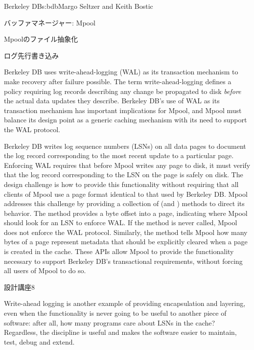 \begin{aosachapter}{Berkeley DB}{s:bdb}{Margo Seltzer and Keith Bostic}
\begin{aosasect1}{バッファマネージャー: Mpool}
\begin{aosasect2}{Mpoolのファイル抽象化}
\end{aosasect2}

\begin{aosasect2}{ログ先行書き込み}

Berkeley DB uses write-ahead-logging (WAL) as its transaction
mechanism to make recovery after failure possible.  The term
write-ahead-logging defines a policy requiring log records describing
any change be propagated to disk \emph{before} the actual data updates
they describe. Berkeley DB's use of WAL as its transaction mechanism
has important implications for Mpool, and Mpool must balance its
design point as a generic caching mechanism with its need to support
the WAL protocol.

Berkeley DB writes log sequence numbers (LSNs) on all data pages to
document the log record corresponding to the most recent update to a
particular page.  Enforcing WAL requires that before Mpool writes any
page to disk, it must verify that the log record corresponding to the
LSN on the page is safely on disk.  The design challenge is how to
provide this functionality without requiring that all clients of Mpool
use a page format identical to that used by Berkeley DB\@. Mpool
addresses this challenge by providing a collection of  (and
) methods to direct its behavior.  The  method
 provides a byte offset into a page, indicating
where Mpool should look for an LSN to enforce WAL\@.  If the method is
never called, Mpool does not enforce the WAL protocol. Similarly, the
 method tells Mpool how many bytes of a page
represent metadata that should be explicitly cleared when a page is
created in the cache. These APIs allow Mpool to provide the
functionality necessary to support Berkeley DB's transactional
requirements, without forcing all users of Mpool to do so. 

\begin{aosabox}{設計講座8}

Write-ahead logging is another example of providing encapsulation and
layering, even when the functionality is never going to be useful to
another piece of software: after all, how many programs care about
LSNs in the cache?  Regardless, the discipline is useful and makes the
software easier to maintain, test, debug and extend.

\end{aosabox}


\end{aosasect2}
\end{aosasect1}
\end{aosachapter}
